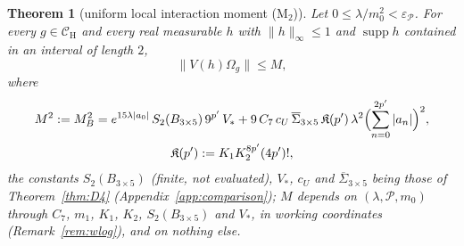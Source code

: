 \documentclass[11pt,a4paper]{article}
\theoremstyle{plain}
\newtheorem{theorem}{Theorem}[section]
\theoremstyle{definition}
\theoremstyle{plain}
\theoremstyle{definition}
\newcommand{\CH}{\mathcal{C}_{\mathrm H}}
\newcommand{\Om}{\Omega}
\DeclareMathOperator{\supp}{supp}
\begin{document}
\begin{theorem}[uniform local interaction moment (M$_2$)]\label{thm:M2}
Let $0\le\lambda/m_0^2<\varepsilon_{\mathscr P}$. For every $g\in\CH$ and every real
measurable $h$ with $\|h\|_\infty\le1$ and $\supp h$ contained in an interval of length
$2$,
\begin{equation}
 \|V(h)\Om_g\|\le M,
 \tag{M$_2$}\label{eq:M2}
\end{equation}
where
\begin{gather*}
 M^2:=M_B^2=e^{15\lambda|a_0|}\,S_2(B_{3\times5})\,9^{p'}\,V_*
 +9\,C_7\,c_U\,\overline\Sigma_{3\times5}\,\mathfrak K(p')\,\lambda^2\Bigl(\sum_{n=0}^{2p'}|a_n|\Bigr)^2,\\
 \mathfrak K(p'):=K_1K_2^{8p'}(4p')! ,
\end{gather*}
the constants $S_2(B_{3\times5})$ (finite, not evaluated), $V_*$, $c_U$ and
$\overline\Sigma_{3\times5}$ being those of Theorem~\ref{thm:D4}
(Appendix~\ref{app:comparison}); $M$ depends on $(\lambda,\mathscr P,m_0)$ through $C_7$,
$m_1$, $K_1$, $K_2$, $S_2(B_{3\times5})$ and $V_*$, in working coordinates
(Remark~\ref{rem:wlog}), and on nothing else.
\end{theorem}
\end{document}
